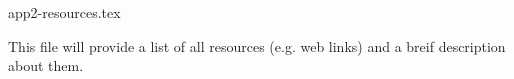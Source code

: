 app2-resources.tex

This file will provide a list of all resources (e.g. web links) and a breif description about them. 
